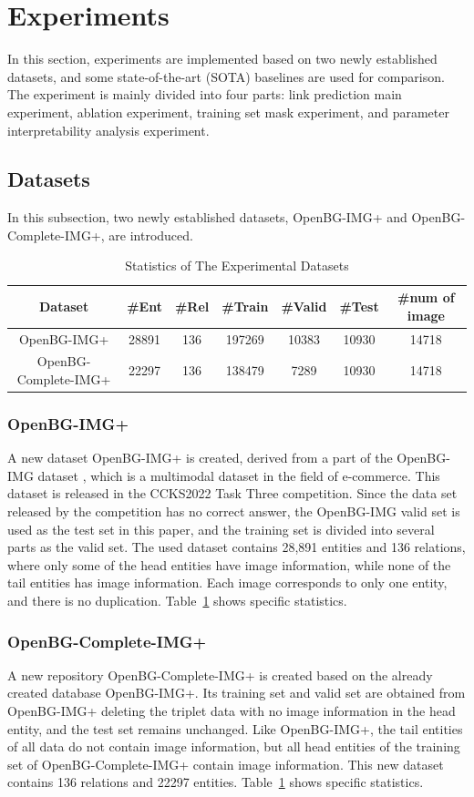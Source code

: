 \documentclass[10pt,journal,compsoc]{IEEEtran}
\begin{document}
\section{Experiments}
In this section, experiments are implemented based on two newly established datasets, and some state-of-the-art (SOTA) baselines are used for comparison. The experiment is mainly divided into four parts: link prediction main experiment, ablation experiment, training set mask experiment, and parameter interpretability analysis experiment.
\subsection{Datasets}
In this subsection, two newly established datasets, OpenBG-IMG+ and OpenBG-Complete-IMG+, are introduced.
\begin{table}[t]
\begin{center}
\caption{Statistics of The Experimental Datasets}
\label{tab1}
\begin{tabular}{ccccccc}
\hline
Dataset    & \#Ent & \#Rel & \#Train & \#Valid & \#Test & \#num of image \\ \hline
OpenBG-IMG+ & 28891 & 136   & 197269  & 10383 & 10930  & 14718  \\
OpenBG-Complete-IMG+ & 22297 & 136 & 138479 & 7289 & 10930 & 14718 \\ \hline
\end{tabular}
\end{center}
\end{table}
\subsubsection{OpenBG-IMG+} A new dataset OpenBG-IMG+ is created, derived from a part of the OpenBG-IMG dataset \cite{ref42}, which is a multimodal dataset in the field of e-commerce. This dataset is released in the CCKS2022 Task Three competition. Since the data set released by the competition has no correct answer, the OpenBG-IMG valid set is used as the test set in this paper, and the training set is divided into several parts as the valid set. The used dataset contains 28,891 entities and 136 relations, where only some of the head entities have image information, while none of the tail entities has image information. Each image corresponds to only one entity, and there is no duplication. Table~\ref{tab1} shows specific statistics.
\subsubsection{OpenBG-Complete-IMG+} A new repository OpenBG-Complete-IMG+ is created based on the already created database OpenBG-IMG+. Its training set and valid set are obtained from OpenBG-IMG+ deleting the triplet data with no image information in the head entity, and the test set remains unchanged. Like OpenBG-IMG+, the tail entities of all data do not contain image information, but all head entities of the training set of OpenBG-Complete-IMG+ contain image information. This new dataset contains 136 relations and 22297 entities. Table~\ref{tab1} shows specific statistics.
\end{document}
